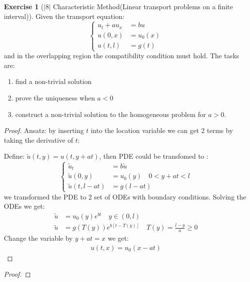 \documentclass[a4paper,11pt,oneside,fleqn]{book}
\theoremstyle{definition}
\newtheorem{exercise}{Exercise}[chapter]
\theoremstyle{remark}
\begin{document}
\begin{exercise}[$|8|$ Characteristic Method(Linear transport problems on a finite interval)]
Given the transport equation:
\begin{equation}
\left\{
\begin{aligned}
u_t + au_x &= bu \\
u(0, x) &= u_0(x)\\
u(t, l) &= g(t)	
\end{aligned}
\right.	
\end{equation}
and in the overlapping region the compatibility condition must hold. The tasks are:
\begin{enumerate}
	\item find a non-trivial solution
	\item prove the uniqueness when $a < 0$
	\item construct a non-trivial solution to the homogeneous problem for $a > 0$. 
\end{enumerate}


\begin{proof}
Ansatz: by inserting $t$ into the location variable we can get 2 terms by taking the derivative of $t$:\par 
Define: $	\tilde{u}(t, y) = u(t, y + at)$, then PDE could be transfomed to :
\begin{equation}
\left\{
\begin{aligned}
	\tilde{u}_t &= b\tilde{u}\\
	\tilde{u}(0, y) &= u_0(y)\quad 0 < y + at < l \\
	\tilde{u}(t, l - at) &= g(l - at)
\end{aligned}
\right.	
\end{equation}
we transformed the PDE to 2 set of ODEs with boundary conditions. Solving the ODEs we get:
\begin{align*}
	\tilde{u} &= u_0(y) e^{bt} \quad y \in (0, l) \\
	\tilde{u} &= g(T(y)) e^{b[t - T(y)]} \quad T(y) = \frac{l - y}{a} \geq 0
\end{align*}
Change the variable by $y + at = x$ we get:
\begin{align*}
	u(t, x) = u_0(x - at)
\end{align*}
\end{proof}
\begin{proof}
\end{proof}


\end{exercise}
\end{document}
